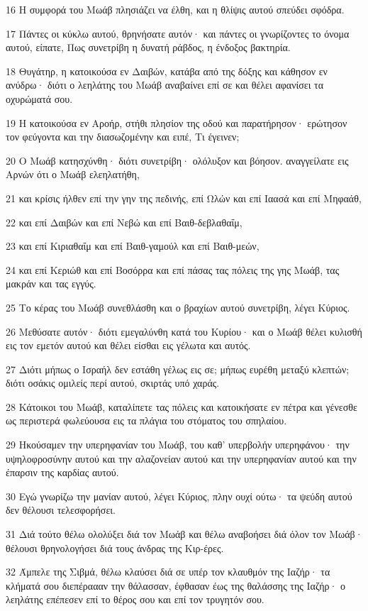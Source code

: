 \par 16 Η συμφορά του Μωάβ πλησιάζει να έλθη, και η θλίψις αυτού σπεύδει σφόδρα.
\par 17 Πάντες οι κύκλω αυτού, θρηνήσατε αυτόν· και πάντες οι γνωρίζοντες το όνομα αυτού, είπατε, Πως συνετρίβη η δυνατή ράβδος, η ένδοξος βακτηρία.
\par 18 Θυγάτηρ, η κατοικούσα εν Δαιβών, κατάβα από της δόξης και κάθησον εν ανύδρω· διότι ο λεηλάτης του Μωάβ αναβαίνει επί σε και θέλει αφανίσει τα οχυρώματά σου.
\par 19 Η κατοικούσα εν Αροήρ, στήθι πλησίον της οδού και παρατήρησον· ερώτησον τον φεύγοντα και την διασωζομένην και ειπέ, Τι έγεινεν;
\par 20 Ο Μωάβ κατησχύνθη· διότι συνετρίβη· ολόλυξον και βόησον. αναγγείλατε εις Αρνών ότι ο Μωάβ ελεηλατήθη,
\par 21 και κρίσις ήλθεν επί την γην της πεδινής, επί Ωλών και επί Ιαασά και επί Μηφαάθ,
\par 22 και επί Δαιβών και επί Νεβώ και επί Βαιθ-δεβλαθαΐμ,
\par 23 και επί Κιριαθαΐμ και επί Βαιθ-γαμούλ και επί Βαιθ-μεών,
\par 24 και επί Κεριώθ και επί Βοσόρρα και επί πάσας τας πόλεις της γης Μωάβ, τας μακράν και τας εγγύς.
\par 25 Το κέρας του Μωάβ συνεθλάσθη και ο βραχίων αυτού συνετρίβη, λέγει Κύριος.
\par 26 Μεθύσατε αυτόν· διότι εμεγαλύνθη κατά του Κυρίου· και ο Μωάβ θέλει κυλισθή εις τον εμετόν αυτού και θέλει είσθαι εις γέλωτα και αυτός.
\par 27 Διότι μήπως ο Ισραήλ δεν εστάθη γέλως εις σε; μήπως ευρέθη μεταξύ κλεπτών; διότι οσάκις ομιλείς περί αυτού, σκιρτάς υπό χαράς.
\par 28 Κάτοικοι του Μωάβ, καταλίπετε τας πόλεις και κατοικήσατε εν πέτρα και γένεσθε ως περιστερά φωλεύουσα εις τα πλάγια του στόματος του σπηλαίου.
\par 29 Ηκούσαμεν την υπερηφανίαν του Μωάβ, του καθ' υπερβολήν υπερηφάνου· την υψηλοφροσύνην αυτού και την αλαζονείαν αυτού και την υπερηφανίαν αυτού και την έπαρσιν της καρδίας αυτού.
\par 30 Εγώ γνωρίζω την μανίαν αυτού, λέγει Κύριος, πλην ουχί ούτω· τα ψεύδη αυτού δεν θέλουσι τελεσφορήσει.
\par 31 Διά τούτο θέλω ολολύξει διά τον Μωάβ και θέλω αναβοήσει διά όλον τον Μωάβ· θέλουσι θρηνολογήσει διά τους άνδρας της Κιρ-έρες.
\par 32 Άμπελε της Σιβμά, θέλω κλαύσει διά σε υπέρ τον κλαυθμόν της Ιαζήρ· τα κλήματά σου διεπέραααν την θάλασσαν, έφθασαν έως της θαλάσσης της Ιαζήρ· ο λεηλάτης επέπεσεν επί το θέρος σου και επί τον τρυγητόν σου.
